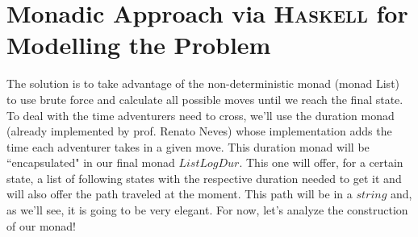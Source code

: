 \documentclass[a4paper]{article}
\def\aspas#1{``#1"}
\newcommand{\Conid}[1]{\mathit{#1}}
\newcommand{\Varid}[1]{\mathit{#1}}
\begin{document}
\section{Monadic Approach via \textsc{Haskell} for Modelling the Problem}
The solution is to take advantage of the non-deterministic monad (monad List) to use brute force and calculate all possible moves until we reach the final state. To deal with the time adventurers need to cross, we'll use the duration monad (already implemented by prof. Renato Neves) whose implementation adds the time each adventurer takes in a given move. This duration monad will be \aspas{encapsulated} in our final monad \ensuremath{\Conid{ListLogDur}}. This one will offer, for a certain state, a list of following states with the respective duration needed to get it and will also offer the path traveled at the moment. This path will be in a \ensuremath{\Varid{string}} and, as we'll see, it is going to be very elegant. For now, let's analyze the construction of our monad!
\end{document}
